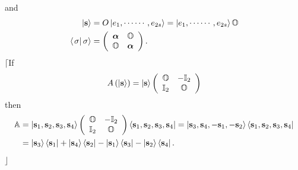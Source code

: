 \documentclass[aps,preprint]{revtex4}%
\begin{document}
and
\begin{align}
\left\vert \mathbf{s}\right\rangle  &  =O\left\vert e_{1},\cdots\cdots
,e_{2s}\right\rangle =\left\vert e_{1},\cdots\cdots,e_{2s}\right\rangle
\mathbb{O}\\
\left\langle \left.  \mathbf{\sigma}\right\vert \mathbf{\sigma}\right\rangle
&  =\left(
\begin{array}
[c]{cc}%
\boldsymbol{\alpha} & \mathbb{O}\\
\mathbb{O} & \boldsymbol{\alpha}%
\end{array}
\right)  .
\end{align}
$\lceil$If
\begin{equation}
A\left(  \left\vert \mathbf{s}\right\rangle \right)  =\left\vert
\mathbf{s}\right\rangle \left(
\begin{array}
[c]{cc}%
\mathbb{O} & -\mathbb{I}_{2}\\
\mathbb{I}_{2} & \mathbb{O}%
\end{array}
\right)
\end{equation}
then%
\begin{align}
\mathbb{A}  &  =\left\vert \mathbf{s}_{1},\mathbf{s}_{2},\mathbf{s}%
_{3},\mathbf{s}_{4}\right\rangle \left(
\begin{array}
[c]{cc}%
\mathbb{O} & -\mathbb{I}_{2}\\
\mathbb{I}_{2} & \mathbb{O}%
\end{array}
\right)  \left\langle \mathbf{s}_{1},\mathbf{s}_{2},\mathbf{s}_{3}%
,\mathbf{s}_{4}\right\vert =\left\vert \mathbf{s}_{3},\mathbf{s}%
_{4},-\mathbf{s}_{1},-\mathbf{s}_{2}\right\rangle \left\langle \mathbf{s}%
_{1},\mathbf{s}_{2},\mathbf{s}_{3},\mathbf{s}_{4}\right\vert \\
&  =\left\vert \mathbf{s}_{3}\right\rangle \left\langle \mathbf{s}%
_{1}\right\vert +\left\vert \mathbf{s}_{4}\right\rangle \left\langle
\mathbf{s}_{2}\right\vert -\left\vert \mathbf{s}_{1}\right\rangle \left\langle
\mathbf{s}_{3}\right\vert -\left\vert \mathbf{s}_{2}\right\rangle \left\langle
\mathbf{s}_{4}\right\vert .
\end{align}
$\rfloor$
\end{document}
